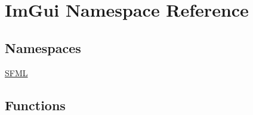\hypertarget{namespace_im_gui}{}\section{Im\+Gui Namespace Reference}
\label{namespace_im_gui}
\subsection*{Namespaces}
\begin{DoxyCompactItemize}
\item 
 \mbox{\hyperlink{namespace_im_gui_1_1_s_f_m_l}{S\+F\+ML}}
\end{DoxyCompactItemize}
\subsection*{Functions}
